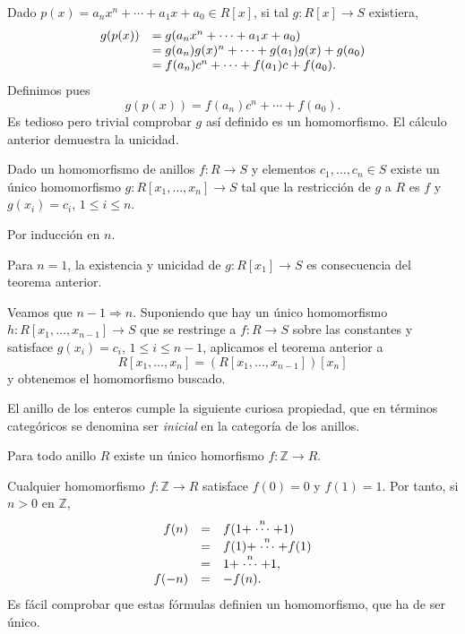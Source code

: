 
Dado \(p(x)=a_nx^n+\cdots+ a_1x+ a_0\in R[x]\), si tal
\(g\colon R[x]\rightarrow S\) existiera, \[
\begin{array}{rl}
g(p(x))&=g(a_nx^n+\cdots+a_1x+ a_0)\cr
&=g(a_n)g(x)^n+\cdots+ g(a_1)g(x)+g(a_0)\cr 
&=f(a_n)c^n+\cdots+ f(a_1)c+f(a_0).
\end{array}
\] Definimos pues \[
g(p(x))=f(a_n)c^n+\cdots+ f(a_0).
\] Es tedioso pero trivial comprobar \(g\) así definido es un
homomorfismo. El cálculo anterior demuestra la unicidad. 


Dado un homomorfismo de anillos \(f\colon R\rightarrow S\) y elementos
\(c_1,\dots, c_n\in S\) existe un único homomorfismo
\(g\colon R[x_1,\dots,x_n]\rightarrow S\) tal que la restricción de
\(g\) a \(R\) es \(f\) y \(g(x_i)=c_i\), \(1\leq i\leq n\).


Por inducción en \(n\).

Para \(n=1\), la existencia y unicidad de
\(g\colon R[x_1]\rightarrow S\) es consecuencia del teorema anterior.

Veamos que \(n-1\Rightarrow n\). Suponiendo que hay un único
homomorfismo \(h\colon R[x_1,\dots,x_{n-1}]\rightarrow S\) que se
restringe a \(f\colon R\rightarrow S\) sobre las constantes y satisface
\(g(x_i)=c_i\), \(1\leq i\leq n-1\), aplicamos el teorema anterior a
\[R[x_1,\dots,x_n]=(R[x_1,\dots,x_{n-1}])[x_n]\] y obtenemos el
homomorfismo buscado.\\

El anillo de los enteros cumple la siguiente curiosa propiedad, que en
términos categóricos se denomina ser \emph{inicial} en la categoría de
los anillos.


Para todo anillo \(R\) existe un único homorfismo
\(f\colon \mathbb Z\rightarrow R\). 


Cualquier homomorfismo \(f\colon \mathbb Z\rightarrow R\) satisface
\(f(0)=0\) y \(f(1)=1\). Por tanto, si \(n>0\) en \(\mathbb Z\),
\[\begin{array}{rcl}
f(n)&=&f(1+\stackrel{n}{\cdots}+1)\cr&=&f(1)+\stackrel{n}{\cdots}+f(1)\cr&=&1+\stackrel{n}{\cdots}+1,\cr
f(-n)&=&-f(n).
\end{array}\] Es fácil comprobar que estas fórmulas definien un
homomorfismo, que ha de ser único.\\

